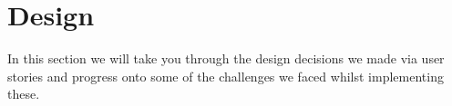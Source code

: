 \section{Design}
In this section we will take you through the design decisions we made via user stories and progress onto some of the challenges we faced whilst implementing these.

